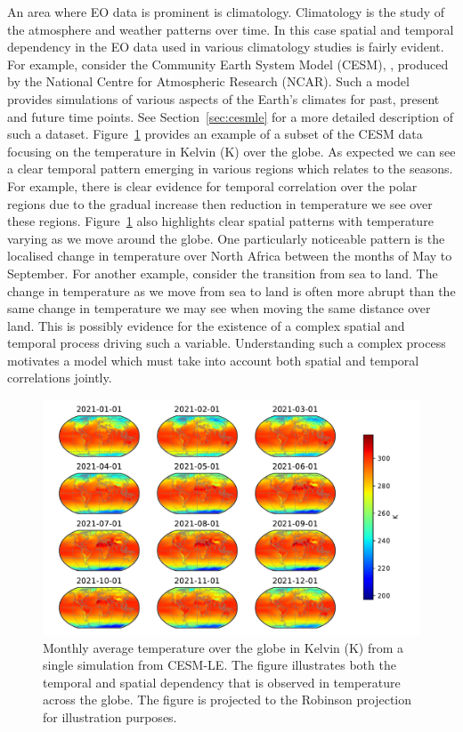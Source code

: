 An area where EO data is prominent is climatology.
Climatology is the study of the atmosphere and weather patterns over time.
In this case spatial and temporal dependency in the EO data used in various climatology studies is fairly evident.
For example, consider the Community Earth System Model (CESM), \citep{kay_community_2015}, produced by the National Centre for Atmospheric Research (NCAR).
Such a model provides simulations of various aspects of the Earth's climates for past, present and future time points.
See Section~\ref{sec:cesmle} for a more detailed description of such a dataset.
Figure~\ref{fig:cesm_example} provides an example of a subset of the CESM data focusing on the temperature in Kelvin ($\si{\kelvin}$) over the globe.
As expected we can see a clear temporal pattern emerging in various regions which relates to the seasons.
For example, there is clear evidence for temporal correlation over the polar regions due to the gradual increase then reduction in temperature we see over these regions.
Figure~\ref{fig:cesm_example} also highlights clear spatial patterns with temperature varying as we move around the globe.
One particularly noticeable pattern is the localised change in temperature over North Africa between the months of May to September.
For another example, consider the transition from sea to land.
The change in temperature as we move from sea to land is often more abrupt than the same change in temperature we may see when moving the same distance over land. 
This is possibly evidence for the existence of a complex spatial and temporal process driving such a variable.
Understanding such a complex process motivates a model which must take into account both spatial and temporal correlations jointly. 



\begin{figure}[htbp!] 
	\centering    
	\includegraphics[width=1.0\textwidth]{cesm_temp_example}
	\caption[The average monthly temperature from the CESM-LE dataset.]{Monthly average temperature over the globe in Kelvin ($\si{\kelvin}$) from a single simulation from CESM-LE. The figure illustrates both the temporal and spatial dependency that is observed in temperature across the globe. The figure is projected to the Robinson projection for illustration purposes.}
	\label{fig:cesm_example}
\end{figure}


